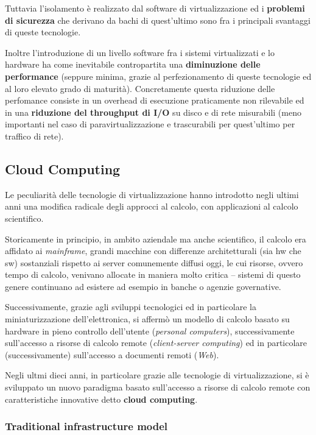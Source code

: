 \documentclass[italian,]{article}
\begin{document}
Tuttavia l'isolamento è realizzato dal software di virtualizzazione ed i
\textbf{problemi di sicurezza} che derivano da bachi di quest'ultimo
sono fra i principali svantaggi di queste tecnologie.

Inoltre l'introduzione di un livello software fra i sistemi
virtualizzati e lo hardware ha come inevitabile contropartita una
\textbf{diminuzione delle performance} (seppure minima, grazie al
perfezionamento di queste tecnologie ed al loro elevato grado di
maturità). Concretamente questa riduzione delle perfomance consiste in
un overhead di esecuzione praticamente non rilevabile ed in una
\textbf{riduzione del throughput di I/O} su disco e di rete misurabili
(meno importanti nel caso di paravirtualizzazione e trascurabili per
quest'ultimo per traffico di rete).

\subsection{Cloud Computing}\label{cloud-computing}

Le peculiarità delle tecnologie di virtualizzazione hanno introdotto
negli ultimi anni una modifica radicale degli approcci al calcolo, con
applicazioni al calcolo scientifico.

Storicamente in principio, in ambito aziendale ma anche scientifico, il
calcolo era affidato ai \emph{mainframe}, grandi macchine con differenze
architetturali (sia hw che sw) sostanziali rispetto ai server
comunemente diffusi oggi, le cui risorse, ovvero tempo di calcolo,
venivano allocate in maniera molto critica -- sistemi di questo genere
continuano ad esistere ad esempio in banche o agenzie governative.

Successivamente, grazie agli sviluppi tecnologici ed in particolare la
miniaturizzazione dell'elettronica, si affermò un modello di calcolo
basato su hardware in pieno controllo dell'utente (\emph{personal
computers}), successivamente sull'accesso a risorse di calcolo remote
(\emph{client-server computing}) ed in particolare (successivamente)
sull'accesso a documenti remoti (\emph{Web}).

Negli ultmi dieci anni, in particolare grazie alle tecnologie di
virtualizzazione, si è sviluppato un nuovo paradigma basato sull'accesso
a risorse di calcolo remote con caratteristiche innovative detto
\textbf{cloud computing}.

\subsubsection{Traditional infrastructure
model}\label{traditional-infrastructure-model}
\end{document}
